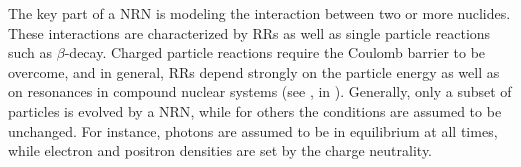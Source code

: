 The key part of a \ac{NRN} is modeling the interaction between two 
or more nuclides. These interactions are characterized by \acp{RR} 
as well as single particle reactions such as $\beta$-decay. 
Charged particle reactions require the Coulomb barrier to be overcome, 
and in general, \acp{RR} depend strongly on the particle energy as well 
as on resonances in compound nuclear systems (see \eg,  
in \citet{Clayton:1968}). 
%
%
%
%
Generally, only a subset of particles is evolved by a \ac{NRN}, while 
for others the conditions are assumed to be unchanged. For instance, 
photons are assumed to be in equilibrium at all 
times, while electron and positron densities are set by the charge 
neutrality. 


